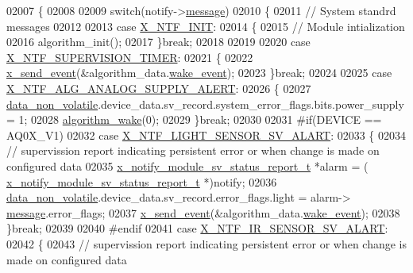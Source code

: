 \begin{DoxyCode}
{{{{{02007 \{
02008 
02009     \textcolor{keywordflow}{switch}(notify->\hyperlink{a00036_adf9665938515a20c283eea2c978cf80d}{message})
02010     \{
02011         \textcolor{comment}{// System standrd messages }
02012 
02013         \textcolor{keywordflow}{case} \hyperlink{a00036_a620b808f2d7b8d2a03c4d026a4c5423c}{X\_NTF\_INIT}:
02014         \{
02015             \textcolor{comment}{// Module intialization    }
02016             algorithm\_init();            
02017         \}\textcolor{keywordflow}{break};
02018 
02019 
02020         \textcolor{keywordflow}{case} \hyperlink{a00016_aededd1ab0a512a03f6cb0d3459b254e1}{X\_NTF\_SUPERVISION\_TIMER}:
02021         \{
02022            \hyperlink{a00036_a4bc3d03c8d62c8237329ed4e969fbc1b}{x\_send\_event}(&algorithm\_data.\hyperlink{a00016_ad6a897cbacf5ae6902272ee198d5cd23}{wake\_event});
02023         \}\textcolor{keywordflow}{break};
02024 
02025         \textcolor{keywordflow}{case}  \hyperlink{a00021_a5c8025c00c22190bf4b4c4fe87123f55}{X\_NTF\_ALG\_ANALOG\_SUPPLY\_ALERT}:            
02026         \{
02027             \hyperlink{a00060_a76ac5f917f5308dcd83de0d7c94559fb}{data\_non\_volatile}.device\_data.sv\_record.system\_error\_flags.bits.power\_supply =
       1;
02028             \hyperlink{a00038_a42ed16c7ef20e0c0031fe7ba7ae377b3}{algorithm\_wake}(0);
02029         \}\textcolor{keywordflow}{break};
02030 
02031 \textcolor{preprocessor}{#if(DEVICE == AQ0X\_V1)}
02032          \textcolor{keywordflow}{case}  \hyperlink{a00021_a472c0187f61238cdef62bf3d965df8e2}{X\_NTF\_LIGHT\_SENSOR\_SV\_ALART}:
02033         \{
02034             \textcolor{comment}{// supervission report indicating persistent error or when change is made on configured data}
02035             \hyperlink{a00021_d7/d1b/a00864}{x\_notify\_module\_sv\_status\_report\_t} *alarm = (
      \hyperlink{a00021_d7/d1b/a00864}{x\_notify\_module\_sv\_status\_report\_t} *)notify;
02036             \hyperlink{a00060_a76ac5f917f5308dcd83de0d7c94559fb}{data\_non\_volatile}.device\_data.sv\_record.error\_flags.light = alarm->
      \hyperlink{a00021_a13393a2d1589483b3bae4d2e79f43980}{message}.error\_flags;
02037              \hyperlink{a00036_a4bc3d03c8d62c8237329ed4e969fbc1b}{x\_send\_event}(&algorithm\_data.\hyperlink{a00016_ad6a897cbacf5ae6902272ee198d5cd23}{wake\_event});
02038         \}\textcolor{keywordflow}{break};
02039 
02040 \textcolor{preprocessor}{#endif}
02041          \textcolor{keywordflow}{case}  \hyperlink{a00021_a0eb06525326cff5fc0fb38f141d6be8e}{X\_NTF\_IR\_SENSOR\_SV\_ALART}:
02042         \{
02043             \textcolor{comment}{// supervission report indicating persistent error or when change is made on configured data}
}}}}}
\end{DoxyCode}

